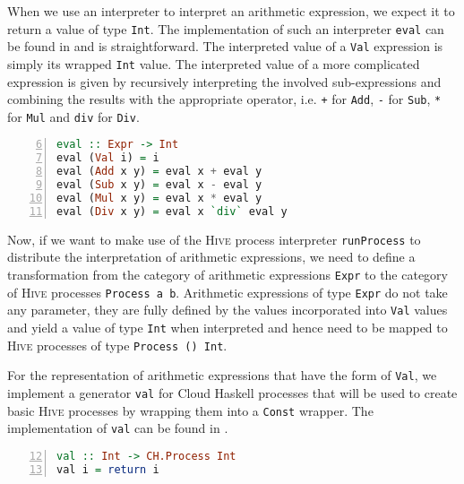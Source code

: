 When we use an interpreter to interpret an arithmetic expression, we expect it to return a value of type \texttt{Int}. The implementation of such an interpreter \texttt{eval} can be found in  and is straightforward. The interpreted value of a \texttt{Val} expression is simply its wrapped \texttt{Int} value. The interpreted value of a more complicated expression is given by recursively interpreting the involved sub-expressions and combining the results with the appropriate operator, i.e. \texttt{+} for \texttt{Add}, \texttt{-} for \texttt{Sub}, \texttt{*} for \texttt{Mul} and \texttt{div} for \texttt{Div}.
\begin{lstlisting}[language=Haskell, caption=Implementation of an interpreter for arithmetic expressions of type \texttt{Expr}., label=lst:arith_eval, numbers=left, frame=bt, firstnumber=6]
eval :: Expr -> Int
eval (Val i) = i
eval (Add x y) = eval x + eval y
eval (Sub x y) = eval x - eval y
eval (Mul x y) = eval x * eval y
eval (Div x y) = eval x `div` eval y
\end{lstlisting}

Now, if we want to make use of the \textsc{Hive} process interpreter \texttt{runProcess} to distribute the interpretation of arithmetic expressions, we need to define a transformation from the category of arithmetic expressions \texttt{Expr} to the category of \textsc{Hive} processes \texttt{Process a b}. Arithmetic expressions of type \texttt{Expr} do not take any parameter, they are fully defined by the values incorporated into \texttt{Val} values and yield a value of type \texttt{Int} when interpreted and hence need to be mapped to \textsc{Hive} processes of type \texttt{Process () Int}.

For the representation of arithmetic expressions that have the form of \texttt{Val}, we implement a generator \texttt{val} for \textsf{Cloud Haskell} processes that will be used to create basic \textsc{Hive} processes by wrapping them into a \texttt{Const} wrapper. The implementation of \texttt{val} can be found in .
\begin{lstlisting}[language=Haskell, caption=A generator for \textsf{Cloud Haskell} process for the representation of \texttt{Val} nodes., label=lst:arith_val, numbers=left, frame=bt, firstnumber=12]
val :: Int -> CH.Process Int
val i = return i
\end{lstlisting}

